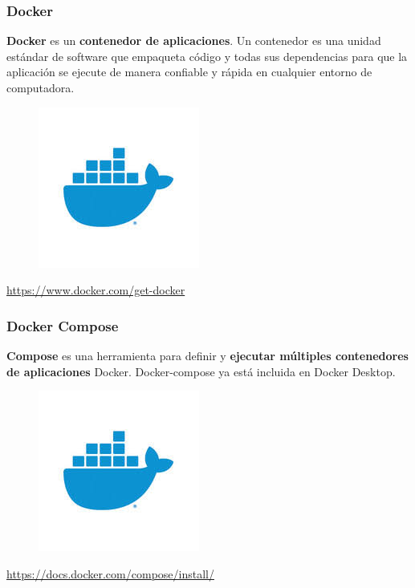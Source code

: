 \documentclass{beamer}
\begin{document}
	\begin{frame}
		\frametitle{Docker}
		\textbf{Docker} es un \textbf{contenedor de aplicaciones}. Un contenedor es una unidad estándar de software que empaqueta código y todas sus dependencias para que la aplicación se ejecute de manera confiable y rápida en cualquier entorno de computadora.
		\begin{figure}[h]
			\includegraphics[scale=.3]{docker}
			\centering
		\end{figure}
		\begin{center}
			\tiny{\url{https://www.docker.com/get-docker}}
		\end{center}
	\end{frame}
	
	\begin{frame}
		\frametitle{Docker Compose}
		\textbf{Compose} es una herramienta para definir y \textbf{ejecutar múltiples contenedores de aplicaciones} Docker. Docker-compose ya está incluida en Docker Desktop.
		\begin{figure}[h]
			\includegraphics[scale=.3]{docker}
			\centering
		\end{figure}
		\begin{center}
			\tiny{\url{https://docs.docker.com/compose/install/}}
		\end{center}
	\end{frame}
\end{document}
